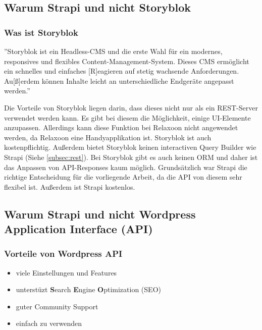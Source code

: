 \subsection{Warum Strapi und nicht Storyblok}
\subsubsection{Was ist Storyblok}
''Storyblok ist ein Headless-CMS und die erste Wahl für ein modernes,
responsives und flexibles Content-Management-System.
Dieses CMS ermöglicht ein schnelles und einfaches [R]eagieren auf stetig wachsende Anforderungen.
Au[ß]erdem können Inhalte leicht an unterschiedliche Endgeräte angepasst werden.''
\cite{storyblok}

Die Vorteile von Storyblok liegen darin, dass dieses nicht nur als ein REST-Server verwendet werden kann. Es gibt bei diesem die Möglichkeit, einige UI-Elemente anzupassen. Allerdings kann diese Funktion bei Relaxoon nicht angewendet werden, da Relaxoon eine Handyapplikation ist.
Storyblok ist auch kostenpflichtig. Außerdem bietet Storyblok keinen interactiven Query Builder wie Strapi (Siehe \ref*{subsec:rest}). Bei Storyblok gibt es auch keinen ORM und daher ist das Anpassen von API-Responses kaum möglich. \cite{storyblok-bad}
Grundsätzlich war Strapi die richtige Entscheidung für die vorliegende Arbeit, da die API von diesem sehr flexibel ist. Außerdem ist Strapi kostenlos.


\subsection{Warum Strapi und nicht Wordpress \textbf{Ap}plication \textbf{I}nterface (API)}



\subsubsection{Vorteile von Wordpress API}

\begin{itemize}
    \item viele Einstellungen und Features
    \item unterstüzt \textbf{S}earch \textbf{E}ngine \textbf{O}ptimization (SEO)
    \item guter Community Support
    \item einfach zu verwenden
\end{itemize}
\cite{strapi-vs-wordpress}

